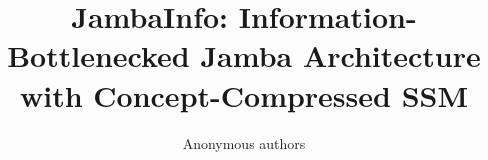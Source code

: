 \title{\textbf{JambaInfo: Information-Bottlenecked Jamba Architecture with Concept-Compressed SSM}}

\author{Anonymous authors}
